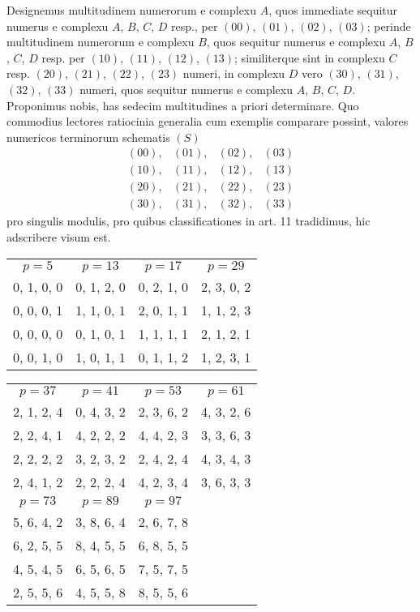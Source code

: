 \documentclass[twoside,12pt]{memoir}
\begin{document}
Designemus multitudinem numerorum e complexu \(A\), quos immediate sequitur numerus e complexu \(A\), \(B\), \(C\), \(D\) resp., per \((00)\), \((01)\), \((02)\), \((03)\); perinde multitudinem numerorum e complexu \(B\), quos sequitur numerus e complexu \(A\), \(B\), \(C\), \(D\) resp. per \((10)\), \((11)\), \((12)\), \((13)\); similiterque sint in complexu \(C\) resp. \((20)\), \((21)\), \((22)\), \((23)\) numeri, in complexu \(D\) vero \((30)\), \((31)\), \((32)\), \((33)\) numeri, quos sequitur numerus e complexu \(A\), \(B\), \(C\), \(D\). Proponimus nobis, has sedecim multitudines a priori determinare. Quo commodius lectores ratiocinia generalia cum exemplis comparare possint, valores numericos terminorum schematis \(({S})\)
\[\begin{array}{llll}
(00), & (01), & (02), & (03) \\
(10), & (11), & (12), & (13) \\
(20), & (21), & (22), & (23) \\
(30), & (31), & (32), & (33)
\end{array}\]
pro singulis modulis, pro quibus classificationes in art. 11 tradidimus, hic adscribere visum est.
\begin{center}\begin{tabular}{c|c|c|c}
\(p=5\) & \(p=13\) & \(p=17\) & \(p=29\) \\
0, 1, 0, 0 & 0, 1, 2, 0 & 0, 2, 1, 0 & 2, 3, 0, 2 \\
0, 0, 0, 1 & 1, 1, 0, 1 & 2, 0, 1, 1 & 1, 1, 2, 3 \\
0, 0, 0, 0 & 0, 1, 0, 1 & 1, 1, 1, 1 & 2, 1, 2, 1 \\
0, 0, 1, 0 & 1, 0, 1, 1 & 0, 1, 1, 2 & 1, 2, 3, 1
\end{tabular}\pagebreak%

\begin{tabular}{c|c|c|c}
\(p=37\) & \(p=41\) & \(p=53\) & \(p=61\) \\
2, 1, 2, 4 & 0, 4, 3, 2 & 2, 3, 6, 2 & 4, 3, 2, 6 \\
2, 2, 4, 1 & 4, 2, 2, 2 & 4, 4, 2, 3 & 3, 3, 6, 3 \\
2, 2, 2, 2 & 3, 2, 3, 2 & 2, 4, 2, 4 & 4, 3, 4, 3 \\
2, 4, 1, 2 & 2, 2, 2, 4 & 4, 2, 3, 4 & 3, 6, 3, 3 \\
\hline
\(p=73\) & \(p=89\) & \(p=97\)   \\
5, 6, 4, 2 & 3, 8, 6, 4 & 2, 6, 7, 8   \\
6, 2, 5, 5 & 8, 4, 5, 5 & 6, 8, 5, 5   \\
4, 5, 4, 5 & 6, 5, 6, 5 & 7, 5, 7, 5   \\
2, 5, 5, 6 & 4, 5, 5, 8 & 8, 5, 5, 6   \\
\end{tabular}
\end{center}
 
\end{document}
